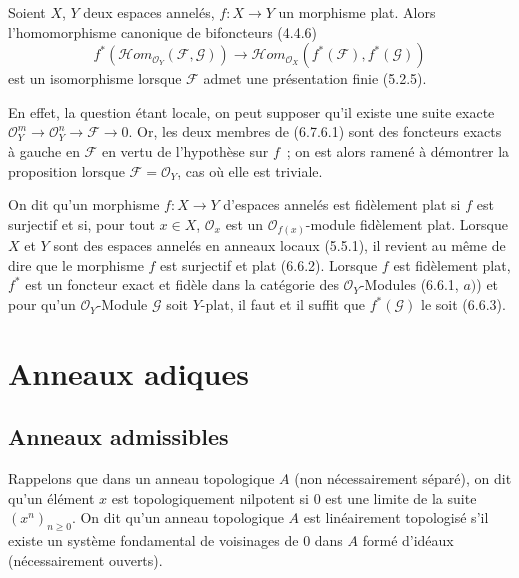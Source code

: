 \begin{env}[6.7.6]
\label{0.6.7.6-fr}
Soient $X$, $Y$ deux espaces annelés, $f:X\to Y$ un morphisme plat. Alors
l'homomorphisme canonique de bifoncteurs (4.4.6)
\[
  f^*(\mathcal{H}om_{\mathcal O_Y}(\mathcal F,\mathcal G))
  \longrightarrow
  \mathcal{H}om_{\mathcal O_X}(f^*(\mathcal F),f^*(\mathcal G))
  \tag{6.7.6.1}
  \label{0.6.7.6.1-fr}
\]
est un isomorphisme lorsque $\mathcal F$ admet une présentation finie
(5.2.5).

En effet, la question étant locale, on peut supposer qu'il existe une suite
exacte $\mathcal O_Y^m\to\mathcal O_Y^n\to\mathcal F\to0$. Or, les deux
membres de (6.7.6.1) sont des foncteurs exacts à gauche en $\mathcal F$ en
vertu de l'hypothèse sur $f$~; on est alors ramené à démontrer la proposition
lorsque $\mathcal F=\mathcal O_Y$, cas où elle est triviale.
\end{env}

\begin{env}[6.7.8]
\label{0.6.7.8-fr}
On dit qu'un morphisme $f:X\to Y$ d'espaces annelés est fidèlement plat si
$f$ est surjectif et si, pour tout $x\in X$, $\mathcal O_x$ est un
$\mathcal O_{f(x)}$-module fidèlement plat. Lorsque $X$ et $Y$ sont des
espaces annelés en anneaux locaux (5.5.1), il revient au même de dire que le
morphisme $f$ est surjectif et plat (6.6.2). Lorsque $f$ est fidèlement plat,
$f^*$ est un foncteur exact et fidèle dans la catégorie des
$\mathcal O_Y$-Modules (6.6.1, $a)$) et pour qu'un $\mathcal O_Y$-Module
$\mathcal G$ soit $Y$-plat, il faut et il suffit que $f^*(\mathcal G)$ le
soit (6.6.3).
\end{env}

\section{Anneaux adiques}
\label{section:0.7-fr}

\subsection{Anneaux admissibles}
\label{subsection:0.7.1-fr}

\begin{env}[7.1.1]
\label{0.7.1.1-fr}
Rappelons que dans un anneau topologique $A$ (non nécessairement séparé), on
dit qu'un élément $x$ est topologiquement nilpotent si $0$ est une limite de
la suite $(x^n)_{n\geq0}$. On dit qu'un anneau topologique $A$ est
linéairement topologisé s'il existe un système fondamental de voisinages de
$0$ dans $A$ formé d'idéaux (nécessairement ouverts).
\end{env}

